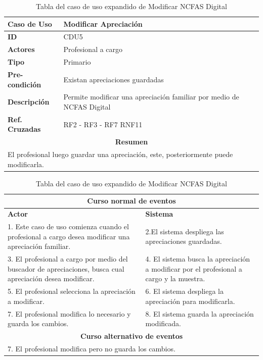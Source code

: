 \begin{table}
	\centering
	\begin{tabular}{|p{6cm} |p{6cm}|}
		\hline \textbf{Caso de Uso} & Modificar Apreciación \\ 
		\hline \textbf{ID} & CDU5 \\ 
		\hline \textbf{Actores} & Profesional a cargo \\ 
		\hline \textbf{Tipo} & Primario \\ 
		\hline \textbf{Pre-condición} & Existan apreciaciones guardadas \\ 
		\hline \textbf{Descripción} & Permite modificar una apreciación familiar por medio de NCFAS Digital \\
		\hline \textbf{Ref. Cruzadas} & RF2 - RF3 - RF7 RNF11 \\ 
		\hline
		\multicolumn{2}{|c|}{\textbf{Resumen}} \\
		\hline
		\multicolumn{2}{|p{12cm}|}{El profesional luego guardar una apreciación, este, posteriormente puede modificarla.} \\
		\hline 
	\end{tabular}  
	\begin{tabular}{|p{6cm}|p{6cm}|}
		
		\multicolumn{2}{|c|}{\textbf{Curso normal de eventos}} \\
		\hline \textbf{Actor} & \textbf{Sistema} \\ 
		\hline 1. Este caso de uso comienza cuando el profesional a cargo desea modificar una apreciación familiar. & 2.El sistema despliega las apreciaciones guardadas.  \\ 
		3. El profesional a cargo por medio del buscador de apreciaciones, busca cual apreciación desea modificar.& 4. El sistema busca la apreciación a modificar por el profesional a cargo y la muestra. \\
		5. El profesional selecciona la apreciación a modificar. & 6. El sistema despliega la apreciación para modificarla. \\
		7. El profesional modifica lo necesario y guarda los cambios. & 8. El sistema guarda la apreciación modificada. \\
		\hline
		\multicolumn{2}{|c|}{\textbf{Curso alternativo de eventos}} \\
		\hline
		\multicolumn{2}{|p{12cm}|}{7. El profesional modifica pero no guarda los cambios. } \\
		\hline
	\end{tabular}
	\caption{Tabla del caso de uso expandido de Modificar NCFAS Digital}
	\label{tabcdu5}
\end{table}

